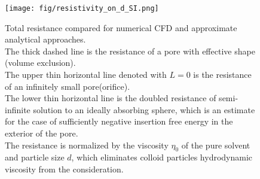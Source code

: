 \documentclass[10pt, a4paper]{article}
\begin{document}
\begin{multicols}{2}
\begin{figure}[H]
    \centering
    \texttt{[image: fig/resistivity\_on\_d\_SI.png]}
    \caption{
        Total resistance compared for numerical CFD and approximate analytical approaches.
        \\
        The thick dashed line is the resistance of a pore with effective shape (volume exclusion).
        \\
        The upper thin horizontal line denoted with $L=0$ is the resistance of an infinitely small pore(orifice).
        \\
        The lower thin horizontal line is the doubled resistance of semi-infinite solution to an ideally absorbing sphere, which is an estimate for the case of sufficiently negative insertion free energy in the exterior of the pore.
        \\
        The resistance is normalized by the viscosity $\eta_{0}$ of the pure solvent and particle size $d$, which  eliminates colloid particles hydrodynamic viscosity from the consideration.
        }
    \label{fig:CFD_comparison}
\end{figure}
    
\end{multicols}



\end{document}
